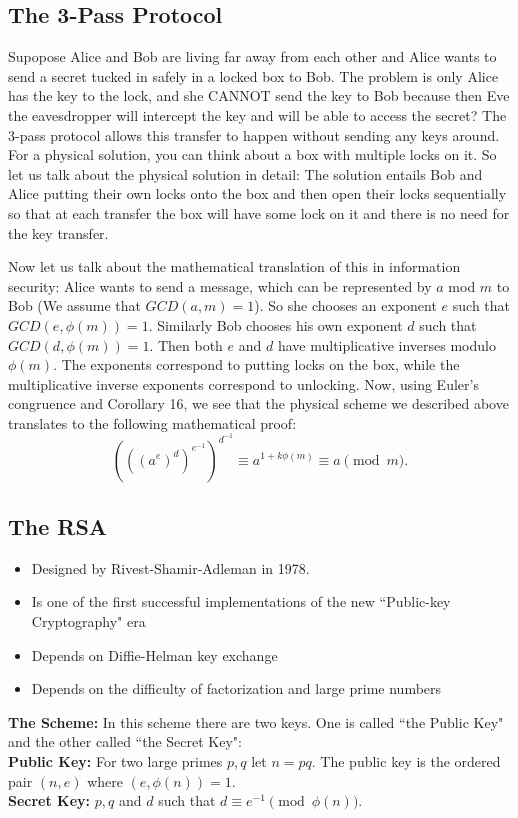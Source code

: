 \documentclass[12pt]{article}
\theoremstyle{plain}
\theoremstyle{definition}
\theoremstyle{remark}
\begin{document}
\subsection{The 3-Pass Protocol}
Supopose Alice and Bob are living far away from each other and Alice wants to send a secret tucked in safely in a locked box to Bob. The problem is only Alice has the key to the lock, and she CANNOT send the key to Bob because then Eve the eavesdropper will intercept the key and will be able to access the secret? The 3-pass protocol allows this transfer to happen without sending any keys around. For a physical solution, you can think about a box with multiple locks on it.
\bigskip
\noindent
So let us talk about the physical solution in detail: The solution entails Bob and Alice putting their own locks onto the box and then open their locks sequentially so that at each transfer the box will have some lock on it and there is no need for the key transfer.

\bigskip
\noindent
Now let us talk about the mathematical translation of this in information security:
Alice wants to send a message, which can be represented by $a$ mod $m$ to Bob (We assume that $GCD(a,m)=1$). So she chooses an exponent $e$ such that $GCD(e, \phi(m))=1$. Similarly Bob chooses his own exponent $d$ such that $GCD(d, \phi(m))=1$. Then both $e$ and $d$ have multiplicative inverses modulo $\phi(m)$. The exponents correspond to putting locks on the box, while the multiplicative inverse exponents correspond to unlocking.  Now, using Euler's congruence and Corollary 16, we see that the physical scheme we described above translates to the following mathematical proof:
$$(((a^e)^d)^{e^{-1}})^{d^{-1}} \equiv a^{1+k\phi(m)}\equiv a \pmod{m}.$$

\subsection{The RSA}
\begin{itemize}
    \item Designed by Rivest-Shamir-Adleman in 1978.
    \item Is one of the first successful implementations of the new ``Public-key Cryptography" era
    \item Depends on Diffie-Helman key exchange
    \item Depends on the difficulty of factorization and large prime numbers
\end{itemize}

\bigskip
\noindent
{\bf The Scheme:} In this scheme there are two keys. One is called ``the Public Key" and the other called ``the Secret Key":
\\
{\bf Public Key:} For two large primes $p, q$ let $n=pq$. The public key is the ordered pair $(n,e)$ where $(e, \phi(n))=1$.
\\
{\bf Secret Key:} $p, q$ and $d$ such that $d\equiv e^{-1} \pmod{\phi(n)}$.
\end{document}
